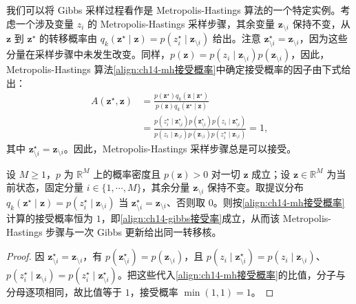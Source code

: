 \documentclass[../../main.tex]{subfiles}
\begin{document}
我们可以将 Gibbs 采样过程看作是 Metropolis-Hastings 算法的一个特定实例。考虑一个涉及变量 $z_{i}$ 的 Metropolis-Hastings 采样步骤，其余变量 $\bm{z}_{\setminus i}$ 保持不变，从 $\bm{z}$ 到 $\bm{z}^{\star}$ 的转移概率由 $q_{k}\!\left(\bm{z}^{\star}\mid\bm{z}\right)=p\!\left(z_{i}^{\star}\mid\bm{z}_{\setminus i}\right)$ 给出。注意 $\bm{z}_{\setminus i}^{\star}=\bm{z}_{\setminus i}$，因为这些分量在采样步骤中未发生改变。同样，$p(\bm{z})=p\!\left(z_{i}\mid\bm{z}_{\setminus i}\right)p\!\left(\bm{z}_{\setminus i}\right)$，因此，Metropolis-Hastings 算法\eqref{align:ch14-mh接受概率}中确定接受概率的因子由下式给出：
\begin{align}
A\!\left(\bm{z}^{\star},\bm{z}\right)&=\frac{p\!\left(\bm{z}^{\star}\right)q_{k}\!\left(\bm{z}\mid\bm{z}^{\star}\right)}{p(\bm{z})q_{k}\!\left(\bm{z}^{\star}\mid\bm{z}\right)}\nonumber\\
&=\frac{p\!\left(z_{i}^{\star}\mid\bm{z}_{\setminus i}^{\star}\right)p\!\left(\bm{z}_{\setminus i}^{\star}\right)p\!\left(z_{i}\mid\bm{z}_{\setminus i}^{\star}\right)}{p\!\left(z_{i}\mid\bm{z}_{\setminus i}\right)p\!\left(\bm{z}_{\setminus i}\right)p\!\left(z_{i}^{\star}\mid\bm{z}_{\setminus i}\right)}=1,
\label{align:ch14-gibbs接受率}
\end{align}
其中 $\bm{z}_{\setminus i}^{\star}=\bm{z}_{\setminus i}$。因此，Metropolis-Hastings 采样步骤总是可以接受。

\begin{proposition}\label{proposition:ch14-gibbs是mh特例}
设 $M\geqslant1$，$p$ 为 $\mathbb{R}^{M}$ 上的概率密度且 $p(\bm{z})>0$ 对一切 $\bm{z}$ 成立；设 $\bm{z}\in\mathbb{R}^{M}$ 为当前状态，固定分量 $i\in\{1,\cdots,M\}$，其余分量 $\bm{z}_{\setminus i}$ 保持不变。取提议分布 $q_{k}(\bm{z}^{\star}\mid\bm{z})=p(z_{i}^{\star}\mid\bm{z}_{\setminus i})$ 当 $\bm{z}^{\star}_{\setminus i}=\bm{z}_{\setminus i}$、否则取 $0$。则按\eqref{align:ch14-mh接受概率}计算的接受概率恒为 $1$，即\eqref{align:ch14-gibbs接受率}成立，从而该 Metropolis-Hastings 步骤与一次 Gibbs 更新给出同一转移核。
\end{proposition}

\begin{proof}
因 $\bm{z}_{\setminus i}^{\star}=\bm{z}_{\setminus i}$，有 $p\!\left(\bm{z}_{\setminus i}^{\star}\right)=p\!\left(\bm{z}_{\setminus i}\right)$，且 $p\!\left(z_{i}\mid\bm{z}_{\setminus i}^{\star}\right)=p\!\left(z_{i}\mid\bm{z}_{\setminus i}\right)$、$p\!\left(z_{i}^{\star}\mid\bm{z}_{\setminus i}\right)=p\!\left(z_{i}^{\star}\mid\bm{z}_{\setminus i}^{\star}\right)$。把这些代入\eqref{align:ch14-mh接受概率}的比值，分子与分母逐项相同，故比值等于 $1$，接受概率 $\min\left(1,1\right)=1$。
\end{proof}
\end{document}
